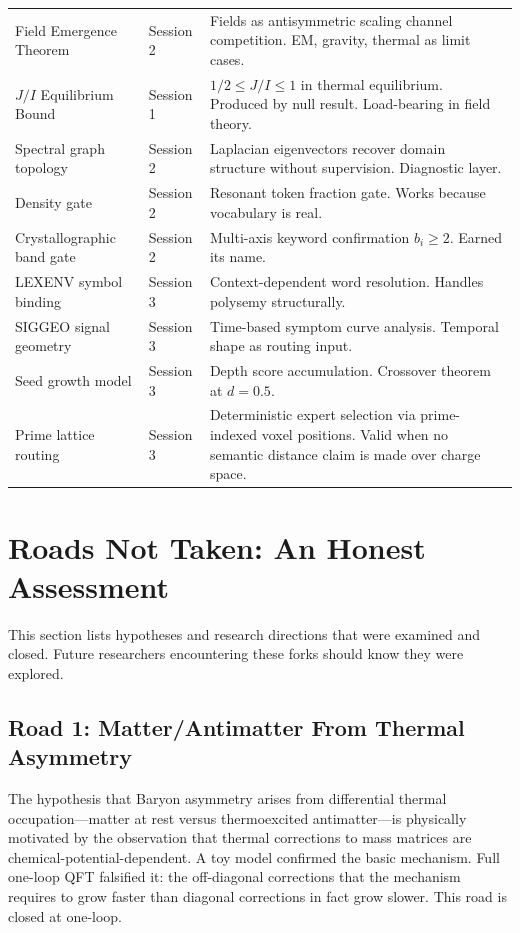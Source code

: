 \documentclass[11pt]{article}
\begin{document}
\begin{longtable}{p{3.5cm}p{2cm}p{7cm}}
\addlinespace
Field Emergence Theorem & Session 2 & Fields as antisymmetric scaling channel competition. EM, gravity, thermal as limit cases. \\
\addlinespace
$J/I$ Equilibrium Bound & Session 1 & $1/2 \leq J/I \leq 1$ in thermal equilibrium. Produced by null result. Load-bearing in field theory. \\
\addlinespace
Spectral graph topology & Session 2 & Laplacian eigenvectors recover domain structure without supervision. Diagnostic layer. \\
\addlinespace
Density gate & Session 2 & Resonant token fraction gate. Works because vocabulary is real. \\
\addlinespace
Crystallographic band gate & Session 2 & Multi-axis keyword confirmation $b_i \geq 2$. Earned its name. \\
\addlinespace
LEXENV symbol binding & Session 3 & Context-dependent word resolution. Handles polysemy structurally. \\
\addlinespace
SIGGEO signal geometry & Session 3 & Time-based symptom curve analysis. Temporal shape as routing input. \\
\addlinespace
Seed growth model & Session 3 & Depth score accumulation. Crossover theorem at $d = 0.5$. \\
\addlinespace
Prime lattice routing & Session 3 & Deterministic expert selection via prime-indexed voxel positions. Valid when no semantic distance claim is made over charge space. \\
\bottomrule
\end{longtable}

\section{Roads Not Taken: An Honest Assessment}
\label{sec:roads}

This section lists hypotheses and research directions that were examined and closed. Future researchers encountering these forks should know they were explored.

\subsection{Road 1: Matter/Antimatter From Thermal Asymmetry}

The hypothesis that Baryon asymmetry arises from differential thermal occupation---matter at rest versus thermoexcited antimatter---is physically motivated by the observation that thermal corrections to mass matrices are chemical-potential-dependent. A toy model confirmed the basic mechanism. Full one-loop QFT falsified it: the off-diagonal corrections that the mechanism requires to grow faster than diagonal corrections in fact grow slower. This road is closed at one-loop.
\end{document}
